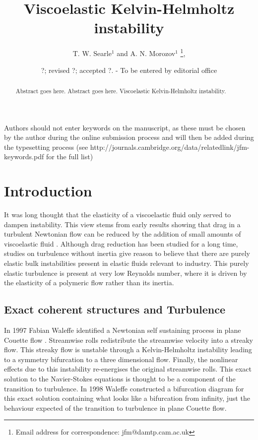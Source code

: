 \documentclass{jfm}
\title[Viscoelastic Kelvin-Helmholtz instabilty]{Viscoelastic Kelvin-Helmholtz instability}
\author[T. W. Searle and A. N. Morozov]%
{T. W. Searle$^1$ and A. N. Morozov$^1$%
  \thanks{Email address for correspondence: jfm@damtp.cam.ac.uk},\ns
}
\affiliation{$^1$SUPA, School of Physics and Astronomy, University of Edinburgh, Mayfield Road,
Edinburgh, EH9 3JZ, UK\\[\affilskip]
}
\date{?; revised ?; accepted ?. - To be entered by editorial office}
\begin{document}
\maketitle

\begin{abstract}
  Abstract goes here. Abstract goes here. Viscoelastic Kelvin-Helmholtz instability. 
\end{abstract}

\begin{keywords}
Authors should not enter keywords on the manuscript, as these must be chosen by
the author during the online submission process and will then be added during
the typesetting process (see
http://journals.cambridge.org/data/\linebreak[3]relatedlink/jfm-\linebreak[3]keywords.pdf
for the full list)
\end{keywords}

\section{Introduction}

It was long thought that the elasticity of a viscoelastic fluid only served to
dampen instability. This view stems from early results showing that drag in a
turbulent Newtonian flow can be reduced by the addition of small amounts of
viscoelastic fluid \citep{Toms1977}. Although drag reduction has been studied
for a long time, studies on turbulence without inertia \citep{Larson1990,
Groisman2000} give reason to believe that there are purely elastic bulk
instabilities present in elastic fluids relevant to industry.  This purely
elastic turbulence is present at very low Reynolds number, where it is driven
by the elasticity of a polymeric flow rather than its inertia. 

\subsection{Exact coherent structures and Turbulence}

In 1997 Fabian Waleffe identified a Newtonian self sustaining process in plane
Couette flow \citep{Waleffe1997}. Streamwise rolls redistribute the streamwise
velocity into a streaky flow. This streaky flow is unstable through a
Kelvin-Helmholtz instability leading to a symmetry bifurcation to a three
dimensional flow. Finally, the nonlinear effects due to this instability
re-energises the original streamwise rolls. This exact solution to the
Navier-Stokes equations is thought to be a component of the transition to
turbulence. In 1998 Waleffe constructed a bifurcation diagram for this exact
solution \citep{Waleffe1998} containing what looks like a bifurcation from
infinity, just the behaviour expected of the transition to turbulence in plane
Couette flow.
\end{document}
